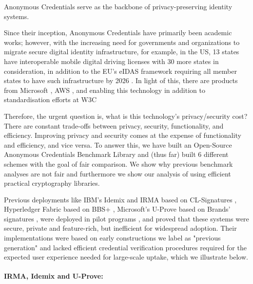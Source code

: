 Anonymous Credentials serve as the backbone of privacy-preserving identity systems. 

Since their inception, Anonymous Credentials have primarily been academic works; however, with the increasing need for governments and organizations to migrate secure digital identity infrastructure, for example, in the US, 13 states have interoperable mobile digital driving licenses \cite{aamva_jurisdiction_nodate} with 30 more states in consideration, in addition to the EU's eIDAS framework requiring all member states to have such infrastructure by 2026 \cite{european_parliament_meps_2024}. In light of this, there are products from Microsoft \cite{microsoft_microsoft_2025}, AWS \cite{aws_verifiable_nodate}, and \cite{dock_labs_dock_nodate} enabling this technology in addition to standardisation efforts at W3C \cite{w3c_verifiable_2025, w3c_decentralized_2022}

Therefore, the urgent question is, what is this technology's privacy/security cost? There are constant trade-offs between privacy, security, functionality, and efficiency. Improving privacy and security comes at the expense of functionality and efficiency, and vice versa. To answer this, we have built an Open-Source Anonymous Credentials Benchmark Library and (thus far) built 6 different schemes with the goal of fair comparison. We show why previous benchmark analyses are not fair and furthermore we show our analysis of using efficient practical cryptography libraries.  

Previous deployments like IBM's Idemix \cite{camenisch_design_2002} and IRMA \cite{fischer-hubner_towards_2013} based on CL-Signatures \cite{camenisch_design_2002, cimato_signature_2003}, Hyperledger Fabric \cite{androulaki_hyperledger_2018} based on BBS+ \cite{hutchison_constant-size_2006}, Microsoft's U-Prove \cite{dunkelman_formal_2016} based on Brands' signatures \cite{brands_rethinking_2000}, were deployed in pilot programs \cite{dunkelman_formal_2016}, and proved that these systems were secure, private and feature-rich, but inefficient for widespread adoption. Their implementations were based on early constructions we label as "previous generation" and lacked efficient credential verification procedures required for the expected user experience needed for large-scale uptake, which we illustrate below.

\paragraph{IRMA, Idemix and U-Prove: }


